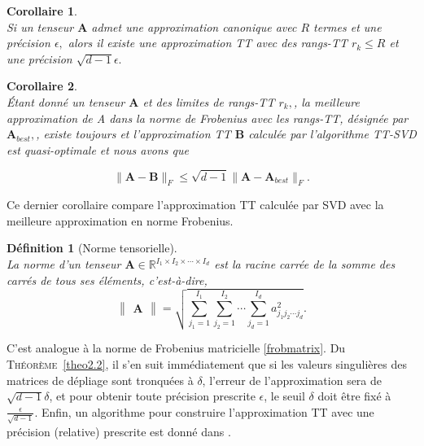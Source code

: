 \documentclass[11pt,a4paper,oneside]{book}
\newtheorem{cor}{Corollaire}[chapter]
\newtheorem{defi}{Définition}[chapter]
\newtheorem{rem}{Remarque}[chapter]
\def\R{\mathbb R}
\def\op{\mathcal O}
\newcommand{\pf}[2]{\frac{#1}{#2}}
\newcommand{\mbf}[1]{\mathbf{#1}}
\newcommand{\theoref}[1]{\textsc{Théorème}~\ref{#1}}
\begin{document}
\begin{cor}
\emph{\\}
Si un tenseur $\mathbf{A}$ admet une approximation canonique avec $ R $ termes et une précision $\epsilon,$ alors il existe une approximation TT avec des rangs-TT $r_k \leq R$  et une précision $\sqrt{d-1}\epsilon.$
\end{cor}
\begin{cor}
\emph{\\}
Étant donné un tenseur $\mathbf{A}$ et des limites de rangs-TT $r_k,$, la meilleure approximation de A dans la norme de Frobenius avec les rangs-TT, désignée par $\mathbf{A}_{best},$, existe toujours et l'approximation TT $\mathbf{B}$ calculée par l'algorithme TT-SVD est quasi-optimale et nous avons que	
	
	\begin{equation}
\|\mathbf{A}-\mathbf{B}\|_{F}  \leq \sqrt{d-1}\|\mathbf{A}-\mathbf{A}_{best}\|_{F}.
\end{equation}	
\end{cor}
Ce dernier corollaire compare l'approximation TT calculée par SVD avec la meilleure approximation en norme Frobenius.
\begin{defi}[Norme tensorielle]
	\emph{\\}
	La norme d'un tenseur $ \mathbf{A} \in \R^{I_{1}\times I_{2}\times\cdots\times I_{d}} $ est la racine carrée de la somme des carrés de tous ses éléments, c'est-à-dire,
	\begin{equation}
	\begin{Vmatrix}
	\mbf{A}
	\end{Vmatrix}=\sqrt{\sum_{j_{1}=1}^{I_{1}}\sum_{j_{2}=1}^{I_{2}}\cdots\sum_{j_{d}=1}^{I_{d}}a_{j_{1}j_{2}\cdots j_{d}}^{2}}.
	\end{equation}
\end{defi}
C'est analogue à la norme de Frobenius matricielle \eqref{frobmatrix}.
Du \theoref{theo2.2}, il s'en suit immédiatement que si les valeurs singulières des matrices de dépliage sont tronquées à $ \delta $, l'erreur de l'approximation sera de $ \sqrt{d-1} \delta$, et pour obtenir toute précision prescrite $ \epsilon $, le seuil $ \delta $ doit être fixé à $ \pf{\epsilon}{\sqrt{d-1}} $. Enfin, un algorithme pour construire l'approximation TT avec une précision (relative) prescrite est donné  dans \cite[p.2301]{oseledets2011tensor}.

\end{document}
